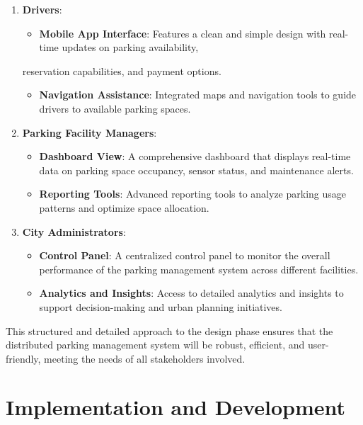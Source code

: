 \documentclass[oneside, 12pt, a4paper, draft]{book}
\begin{document}
\begin{enumerate}
\item \textbf{\textbf{Drivers}}:
\begin{itemize}
\item \textbf{\textbf{Mobile App Interface}}: Features a clean and simple design with real-time updates on parking availability,
\end{itemize}

reservation capabilities, and payment options.
\begin{itemize}
\item \textbf{\textbf{Navigation Assistance}}: Integrated maps and navigation tools to guide drivers to available parking spaces.
\end{itemize}

\item \textbf{\textbf{Parking Facility Managers}}:
\begin{itemize}
\item \textbf{\textbf{Dashboard View}}: A comprehensive dashboard that displays real-time data on parking space occupancy, sensor status, and maintenance alerts.
\item \textbf{\textbf{Reporting Tools}}: Advanced reporting tools to analyze parking usage patterns and optimize space allocation.
\end{itemize}

\item \textbf{\textbf{City Administrators}}:
\begin{itemize}
\item \textbf{\textbf{Control Panel}}: A centralized control panel to monitor the overall performance of the parking management system across different facilities.
\item \textbf{\textbf{Analytics and Insights}}: Access to detailed analytics and insights to support decision-making and urban planning initiatives.
\end{itemize}
\end{enumerate}

This structured and detailed approach to the design phase ensures that the distributed parking management system will be robust, efficient, and user-friendly, meeting the needs of all stakeholders involved.
\part{Implementation and Development}
\label{sec:org13a5ec8}
\end{document}
